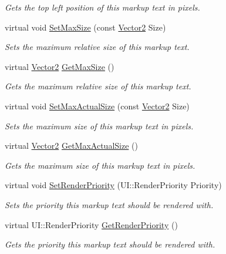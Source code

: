 \begin{DoxyCompactItemize}
\begin{DoxyCompactList}\small\item\em Gets the top left position of this markup text in pixels. \item\end{DoxyCompactList}\item 
virtual void \hyperlink{classphys_1_1UI_1_1MarkupText_af8dd68edd25e9553fe559ad46852cd71}{SetMaxSize} (const \hyperlink{classphys_1_1Vector2}{Vector2} Size)
\begin{DoxyCompactList}\small\item\em Sets the maximum relative size of this markup text. \item\end{DoxyCompactList}\item 
virtual \hyperlink{classphys_1_1Vector2}{Vector2} \hyperlink{classphys_1_1UI_1_1MarkupText_ae68fd261f2dc9494a16e3089c7a35b8a}{GetMaxSize} ()
\begin{DoxyCompactList}\small\item\em Gets the maximum relative size of this markup text. \item\end{DoxyCompactList}\item 
virtual void \hyperlink{classphys_1_1UI_1_1MarkupText_a03b0e586c48e885b9c57968413603fa9}{SetMaxActualSize} (const \hyperlink{classphys_1_1Vector2}{Vector2} Size)
\begin{DoxyCompactList}\small\item\em Sets the maximum size of this markup text in pixels. \item\end{DoxyCompactList}\item 
virtual \hyperlink{classphys_1_1Vector2}{Vector2} \hyperlink{classphys_1_1UI_1_1MarkupText_a4a742f4d64038ded68c5480f4cf3e017}{GetMaxActualSize} ()
\begin{DoxyCompactList}\small\item\em Gets the maximum size of this markup text in pixels. \item\end{DoxyCompactList}\item 
virtual void \hyperlink{classphys_1_1UI_1_1MarkupText_a65662c49802fa5b82a04ac387b55493f}{SetRenderPriority} (UI::RenderPriority Priority)
\begin{DoxyCompactList}\small\item\em Sets the priority this markup text should be rendered with. \item\end{DoxyCompactList}\item 
virtual UI::RenderPriority \hyperlink{classphys_1_1UI_1_1MarkupText_a86afb23309534d86ed9675170b321874}{GetRenderPriority} ()
\begin{DoxyCompactList}\small\item\em Gets the priority this markup text should be rendered with. \item\end{DoxyCompactList}\end{DoxyCompactItemize}
